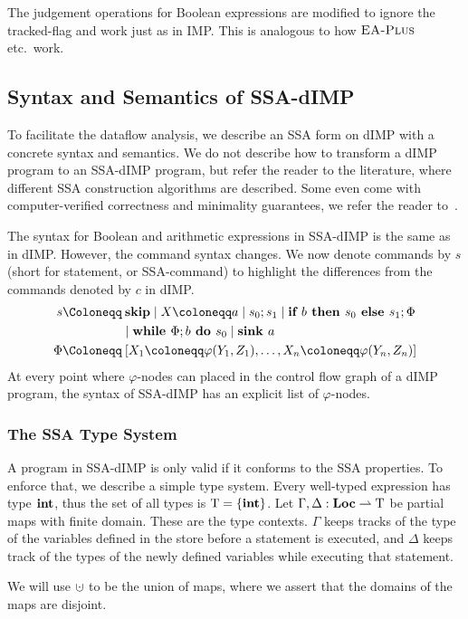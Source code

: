 The judgement operations for Boolean expressions are modified to ignore the tracked-flag and work
just as in IMP. This is analogous to how $\textsc{EA-Plus}$ etc.\ work.
\fi

\subsection{Syntax and Semantics of SSA-dIMP}
To facilitate the dataflow analysis, we describe an SSA form on dIMP with a concrete
syntax and semantics.
We do not describe how to transform a dIMP program to an SSA-dIMP program, but 
refer the reader to the literature, where different SSA construction algorithms are
described. Some even come with computer-verified correctness and minimality guarantees,
we refer the reader to~\cite{verifiedssa}.

The syntax for Boolean and arithmetic expressions in SSA-dIMP is the same as in dIMP.
However, the command syntax changes.
We now denote commands by $s$ (short for statement, or SSA-command) to highlight the differences
from the commands denoted by $c$ in dIMP.
\begin{align*}
    s \Coloneqq &\:\skipcmd \mid \defaultstore \mid \defaultssaseq \mid \defaultssaif\\
    &\mid \defaultssawhile  \mid \defaultsink \\
    \philist \Coloneqq &\: \defaultphilistn\\
\end{align*}
At every point where $\varphi$-nodes can placed in the control flow graph
of a dIMP program, the syntax of SSA-dIMP has an explicit list of $\varphi$-nodes.

\subsubsection*{The SSA Type System}
A program in SSA-dIMP is only valid if it conforms to the SSA properties.
To enforce that, we describe a simple type system.
Every well-typed expression has type $\textbf{int}$, thus the set of all types is $\mathrm{T} = \{ \textbf{int} \}$.
Let $\Gamma, \Delta: \textbf{Loc} \rightharpoonup \mathrm{T}$ be partial maps with finite domain.
These are the type contexts.
$\Gamma$ keeps tracks of the type of the variables defined in the store before a 
statement is executed, and $\Delta$ keeps track of the types of the 
newly defined variables while executing that statement.

We will use $\dunion$ to be the union of maps, 
where we assert that the domains of the maps are disjoint.

